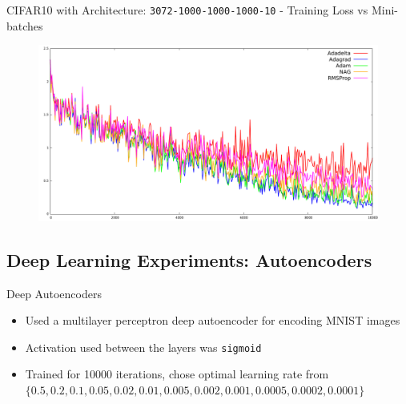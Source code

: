 \documentclass[10pt]{beamer}
\begin{document}
\begin{frame}{CIFAR10 with Architecture: \texttt{3072-1000-1000-1000-10} - Training Loss vs Mini-batches}
\begin{figure}
\centering
\includegraphics[width=\linewidth]{./images/cifar10-2.pdf}
\end{figure}
\end{frame}

\subsection{Deep Learning Experiments: Autoencoders}
\begin{frame}{Deep Autoencoders}
\begin{itemize}
\item<1->{Used a multilayer perceptron deep autoencoder for encoding MNIST images}
\item<2->{Activation used between the layers was \texttt{sigmoid}}
\item<3->{Trained for 10000 iterations, chose optimal learning rate from \(\{0.5, 0.2, 0.1, 0.05, 0.02, 0.01, 0.005, 0.002, 0.001, 0.0005, 0.0002, 0.0001\}\)}
\end{itemize}
\end{frame}
\end{document}
